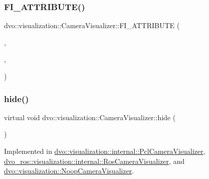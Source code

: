 \subsubsection{\texorpdfstring{F\+I\+\_\+\+A\+T\+T\+R\+I\+B\+U\+T\+E()}{FI\_ATTRIBUTE()}\hspace{0.1cm}{\footnotesize\ttfamily [2/2]}}
{\footnotesize\ttfamily dvo\+::visualization\+::\+Camera\+Visualizer\+::\+F\+I\+\_\+\+A\+T\+T\+R\+I\+B\+U\+TE (\begin{DoxyParamCaption}\item[{\mbox{\hyperlink{classdvo_1_1visualization_1_1_camera_visualizer}{Camera\+Visualizer}}}]{,  }\item[{\mbox{\hyperlink{structdvo_1_1visualization_1_1_color}{Color}}}]{,  }\item[{color}]{ }\end{DoxyParamCaption})}

\mbox{\label{classdvo_1_1visualization_1_1_camera_visualizer_a45dbf0d449a7b7529f7da477c676ca85}} 
\subsubsection{\texorpdfstring{hide()}{hide()}}
{\footnotesize\ttfamily virtual void dvo\+::visualization\+::\+Camera\+Visualizer\+::hide (\begin{DoxyParamCaption}{ }\end{DoxyParamCaption})\hspace{0.3cm}{\ttfamily [pure virtual]}}



Implemented in \mbox{\hyperlink{classdvo_1_1visualization_1_1internal_1_1_pcl_camera_visualizer_ad261307239a87bc10ba4d0662960cc72}{dvo\+::visualization\+::internal\+::\+Pcl\+Camera\+Visualizer}}, \mbox{\hyperlink{classdvo__ros_1_1visualization_1_1internal_1_1_ros_camera_visualizer_a4812a8e3c5573a68fb74cabbf2f70422}{dvo\+\_\+ros\+::visualization\+::internal\+::\+Ros\+Camera\+Visualizer}}, and \mbox{\hyperlink{classdvo_1_1visualization_1_1_noop_camera_visualizer_a875ff591e3db513ddbec48478989639e}{dvo\+::visualization\+::\+Noop\+Camera\+Visualizer}}.

\mbox{\label{classdvo_1_1visualization_1_1_camera_visualizer_a646b21ea800d07f6a4174c80daf2bf50}} 
